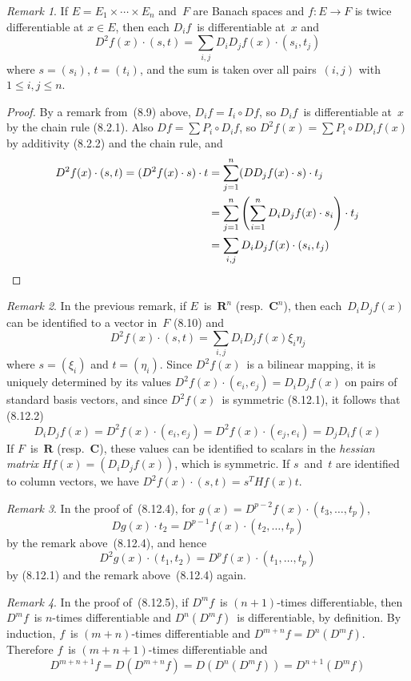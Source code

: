 \documentclass[letterpaper,12pt]{article}
\newcommand{\R}{\mathbf{R}}
\newcommand{\C}{\mathbf{C}}
\newcommand{\after}{\circ}
\newcommand{\at}{\cdot}
\theoremstyle{plain}
\theoremstyle{definition}
\theoremstyle{remark}
\newtheorem*{rmk}{Remark}
\begin{document}
\begin{rmk}
If \(E=E_1\times\cdots\times E_n\) and~\(F\) are Banach spaces and \(f:E\to F\) is twice differentiable at \(x\in E\), then each \(D_i f\)~is differentiable at~\(x\) and
\[D^2f(x)\at(s,t)=\sum_{i,j}D_iD_jf(x)\at(s_i,t_j)\]
where \(s=(s_i)\), \(t=(t_i)\), and the sum is taken over all pairs~\((i,j)\) with \(1\le i,j\le n\).
\end{rmk}
\begin{proof}
By a remark from~(8.9) above, \(D_if=I_i\after Df\), so \(D_if\)~is differentiable at~\(x\) by the chain rule (8.2.1). Also \(Df=\sum P_i\after D_if\), so \(D^2f(x)=\sum P_i\after DD_if(x)\) by additivity (8.2.2) and the chain rule, and
\begin{align*}
D^2f(x)\at(s,t)=(D^2f(x)\at s)\at t&=\sum_{j=1}^n(DD_jf(x)\at s)\at t_j\\
	&=\sum_{j=1}^n\left(\sum_{i=1}^nD_iD_jf(x)\at s_i\right)\at t_j\\
	&=\sum_{i,j}D_iD_jf(x)\at(s_i,t_j)\qedhere
\end{align*}
\end{proof}

\begin{rmk}
In the previous remark, if \(E\)~is~\(\R^n\) (resp.~\(\C^n\)), then each~\(D_iD_jf(x)\) can be identified to a vector in~\(F\) (8.10) and
\[D^2f(x)\at(s,t)=\sum_{i,j}D_iD_jf(x)\xi_i\eta_j\]
where \(s=(\xi_i)\) and \(t=(\eta_i)\). Since \(D^2f(x)\)~is a bilinear mapping, it is uniquely determined by its values \(D^2f(x)\at(e_i,e_j)=D_iD_jf(x)\) on pairs of standard basis vectors, and since \(D^2f(x)\)~is symmetric (8.12.1), it follows that (8.12.2)
\[D_iD_jf(x)=D^2f(x)\at(e_i,e_j)=D^2f(x)\at(e_j,e_i)=D_jD_if(x)\]
If \(F\)~is~\(\R\) (resp.~\(\C\)), these values can be identified to scalars in the \emph{hessian matrix} \(Hf(x)=(D_iD_jf(x))\), which is symmetric. If \(s\)~and~\(t\) are identified to column vectors, we have \(D^2f(x)\at(s,t)=s^T Hf(x) t\).
\end{rmk}

\begin{rmk}
In the proof of~(8.12.4), for \(g(x)=D^{p-2}f(x)\at(t_3,\ldots,t_p)\),
\[Dg(x)\at t_2=D^{p-1}f(x)\at(t_2,\ldots,t_p)\]
by the remark above~(8.12.4), and hence
\[D^2g(x)\at(t_1,t_2)=D^pf(x)\at(t_1,\ldots,t_p)\]
by (8.12.1) and the remark above~(8.12.4) again.
\end{rmk}

\begin{rmk}
In the proof of~(8.12.5), if \(D^mf\)~is \((n+1)\)-times differentiable, then \(D^mf\)~is \(n\)-times differentiable and \(D^n(D^m f)\)~is differentiable, by definition. By induction, \(f\)~is \((m+n)\)-times differentiable and \(D^{m+n}f=D^n(D^mf)\). Therefore \(f\)~is \((m+n+1)\)-times differentiable and
\[D^{m+n+1}f=D(D^{m+n}f)=D(D^n(D^mf))=D^{n+1}(D^mf)\]
\end{rmk}
\end{document}
